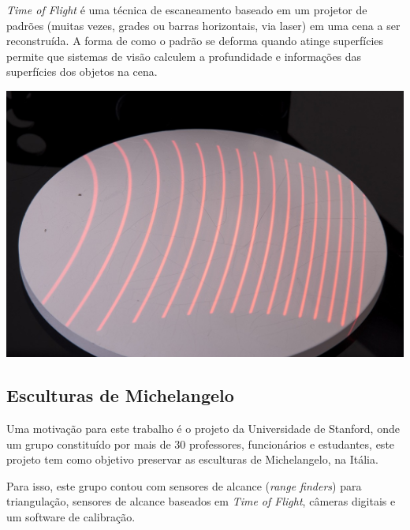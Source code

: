\documentclass[table, usenames, svgnames, xcolor=dvipsnames]{beamer}
\begin{document}
\begin{frame}
	\begin{center}
		\emph{Time of Flight} é uma técnica de escaneamento baseado em um projetor de padrões (muitas vezes, grades ou barras horizontais, via laser) em uma cena a ser reconstruída. A forma de como o padrão se deforma quando atinge superfícies permite que sistemas de visão calculem a profundidade e informações das superfícies dos objetos na cena.
	\end{center}
\end{frame}

\begin{frame} 
	\begin{center}
		\centering
		\includegraphics[width=0.7\linewidth]{figs/luzestruturada.jpg}
	\end{center}
\end{frame}

\subsection{Esculturas de Michelangelo}

\begin{frame} 
	\begin{center}
		Uma motivação para este trabalho é o projeto da Universidade de Stanford, onde um grupo constituído por mais de 30 professores, funcionários e estudantes, este projeto tem como objetivo preservar as esculturas de Michelangelo, na Itália.
	\end{center}
\end{frame}

\begin{frame} 
	\begin{center}
		Para isso, este grupo contou com sensores de alcance (\emph{range finders}) para triangulação, sensores de alcance baseados em \emph{Time of Flight}, câmeras digitais e um software de calibração.
	\end{center}
\end{frame}
\end{document}

